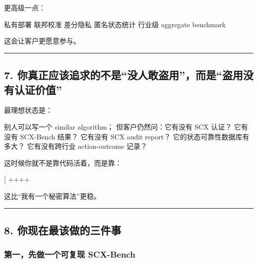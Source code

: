 \documentclass[
  12pt,
]{ctexart}
\newenvironment{Shaded}{}{}
\newcommand{\NormalTok}[1]{#1}
\begin{document}
更高级一点：

\begin{Shaded}
\begin{Highlighting}[]
\NormalTok{私有部署}
\NormalTok{联邦校准}
\NormalTok{差分隐私}
\NormalTok{匿名状态统计}
\NormalTok{行业级 aggregate benchmark}
\end{Highlighting}
\end{Shaded}

这会让客户更愿意参与。

\begin{center}\rule{0.5\linewidth}{0.5pt}\end{center}

\subsection{7.
你真正应该追求的不是``没人敢盗用''，而是``盗用没有认证价值''}\label{ux4f60ux771fux6b63ux5e94ux8be5ux8ffdux6c42ux7684ux4e0dux662fux6ca1ux4ebaux6562ux76d7ux7528ux800cux662fux76d7ux7528ux6ca1ux6709ux8ba4ux8bc1ux4ef7ux503c}

最理想状态是：

\begin{Shaded}
\begin{Highlighting}[]
\NormalTok{别人可以写一个 similar algorithm；}
\NormalTok{但客户仍然问：它有没有 SCX 认证？}
\NormalTok{它有没有 SCX{-}Bench 结果？}
\NormalTok{它有没有 SCX audit report？}
\NormalTok{它的状态可靠性数据库有多大？}
\NormalTok{它有没有跨行业 action{-}outcome 记录？}
\end{Highlighting}
\end{Shaded}

这时候你就不是靠代码活着，而是靠：

{[} ++++\text{公信力}{]}

这比``我有一个秘密算法''更稳。

\begin{center}\rule{0.5\linewidth}{0.5pt}\end{center}

\subsection{8.
你现在最该做的三件事}\label{ux4f60ux73b0ux5728ux6700ux8be5ux505aux7684ux4e09ux4ef6ux4e8b}

\subsubsection{第一，先做一个可复现
SCX-Bench}\label{ux7b2cux4e00ux5148ux505aux4e00ux4e2aux53efux590dux73b0-scx-bench}
\end{document}
